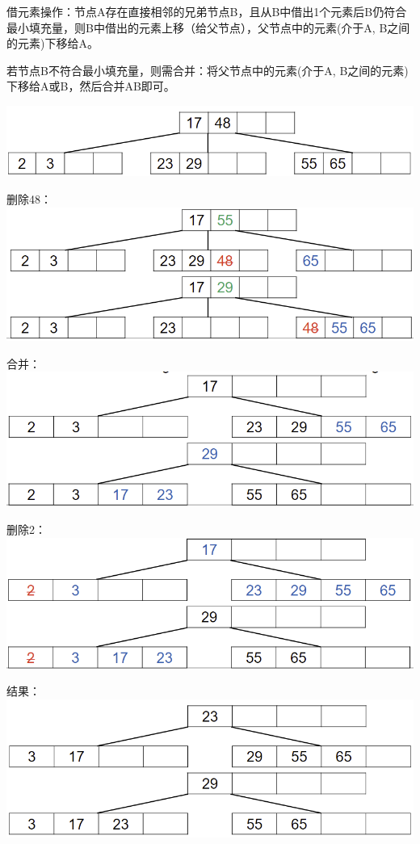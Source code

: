 \documentclass[fleqn]{article}
\begin{document}
借元素操作：节点A存在直接相邻的兄弟节点B，且从B中借出1个元素后B仍符合最小填充量，则B中借出的元素上移（给父节点），父节点中的元素(介于A, B之间的元素)下移给A。

若节点B不符合最小填充量，则需合并：将父节点中的元素(介于A, B之间的元素)下移给A或B，然后合并AB即可。

\begin{center}
    \includegraphics[scale=0.5]{34.png}

    删除48：
    \includegraphics[scale=0.5]{35.png}

    合并：
    \includegraphics[scale=0.5]{36.png}

    删除2：
    \includegraphics[scale=0.5]{37.png}

    结果：
    \includegraphics[scale=0.5]{38.png}
\end{center}
\end{document}

